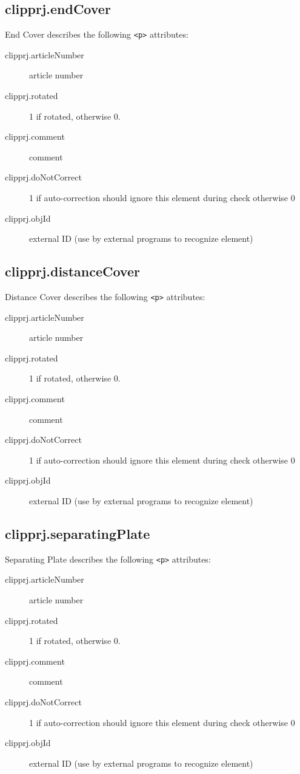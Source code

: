 \documentclass[%
	a4paper,
	oneside,
	listof=numbered,
	parskip=half,
	headsepline=true,
	footsepline=true,
	]{scrbook}
\begin{document}
\subsection{clipprj.endCover}
 
End Cover describes the following \verb|<p>| attributes: 

\begin{description}
	\item[clipprj.articleNumber] article number 
	\item[clipprj.rotated] 1 if rotated, otherwise 0. 
	\item[clipprj.comment] comment 
	\item[clipprj.doNotCorrect] 1 if auto-correction should ignore this element during check otherwise 0 
	\item[clipprj.objId] external ID (use by external programs to recognize element) 
\end{description}

\subsection{clipprj.distanceCover}
 
Distance Cover describes the following \verb|<p>| attributes: 

\begin{description}
	\item[clipprj.articleNumber] article number 
	\item[clipprj.rotated] 1 if rotated, otherwise 0. 
	\item[clipprj.comment] comment 
	\item[clipprj.doNotCorrect] 1 if auto-correction should ignore this element during check otherwise 0 
	\item[clipprj.objId] external ID (use by external programs to recognize element) 
\end{description}

\subsection{clipprj.separatingPlate}
 
Separating Plate describes the following \verb|<p>| attributes: 

\begin{description}
	\item[clipprj.articleNumber] article number 
	\item[clipprj.rotated] 1 if rotated, otherwise 0. 
	\item[clipprj.comment] comment 
	\item[clipprj.doNotCorrect] 1 if auto-correction should ignore this element during check otherwise 0 
	\item[clipprj.objId] external ID (use by external programs to recognize element) 
\end{description}
\end{document}
